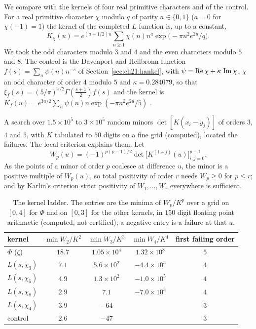 We compare with the kernels of four real primitive characters and of the control. For a real primitive character $\chi$ modulo $q$ of parity $a\in\{0,1\}$ ($a=0$ for $\chi(-1)=1$) the kernel of the completed $L$ function is, up to a constant,
\[
K_\chi(u)=e^{(a+1/2)u}\sum_{n\ge1}\chi(n)n^a\exp\big(-\pi n^2e^{2u}/q\big).
\]
We took the odd characters modulo $3$ and $4$ and the even characters modulo $5$ and $8$. The control is the Davenport and Heilbronn function $f(s)=\sum_n\psi(n)n^{-s}$ of Section~\ref{sec:ch21:hankel}, with $\psi=\operatorname{Re}\chi+\kappa\,\operatorname{Im}\chi$, $\chi$ an odd character of order $4$ modulo $5$ and $\kappa=0.284079$, so that $\xi_f(s)=(5/\pi)^{s/2}\Gamma(\frac{s+1}2)f(s)$ and the kernel is $K_f(u)=e^{3u/2}\sum_n\psi(n)n\exp(-\pi n^2e^{2u}/5)$ \cite{DH36}.

A search over $1.5\times10^5$ to $3\times10^5$ random minors $\det[K(x_i-y_j)]$ of orders $3$, $4$ and $5$, with $K$ tabulated to $50$ digits on a fine grid (computed), located the failures. The local criterion explains them. Let
\[
W_p(u)=(-1)^{p(p-1)/2}\det\big[K^{(i+j)}(u)\big]_{i,j=0}^{p-1}.
\]
As the points of a minor of order $p$ coalesce at difference $u$, the minor is a positive multiple of $W_p(u)$, so total positivity of order $r$ needs $W_p\ge0$ for $p\le r$; and by Karlin's criterion \cite{Karlin68} strict positivity of $W_1,\dots,W_r$ everywhere is sufficient.

\begin{table}[t]
\centering
\footnotesize
\begin{tabular}{lcccc}
\toprule
kernel & $\min W_2/K^2$ & $\min W_3/K^3$ & $\min W_4/K^4$ & first failing order\\
\midrule
$\Phi$ ($\zeta$) & $18.7$ & $1.05\times10^4$ & $1.32\times10^8$ & $5$\\
$L(s,\chi_3)$ & $7.1$ & $5.6\times10^2$ & $-4.4\times10^5$ & $4$\\
$L(s,\chi_5)$ & $4.9$ & $1.3\times10^2$ & $-1.0\times10^5$ & $4$\\
$L(s,\chi_8)$ & $2.9$ & $7.1$ & $-7.0\times10^3$ & $4$\\
$L(s,\chi_4)$ & $3.9$ & $-64$ & & $3$\\
control & $2.6$ & $-47$ & & $3$\\
\bottomrule
\end{tabular}
\caption{The kernel ladder. The entries are the minima of $W_p/K^p$ over a grid on $[0,4]$ for $\Phi$ and on $[0,3]$ for the other kernels, in $150$ digit floating point arithmetic (computed, not certified); a negative entry is a failure at that $u$.}
\label{c:tab:kernel}
\end{table}

